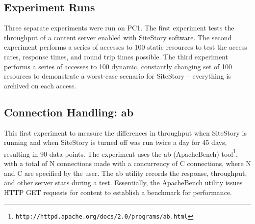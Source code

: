 \documentclass[runningheads,a4paper]{llncs}
\begin{document}


\subsection{Experiment Runs}
\label{runs}
\vskip -3mm
Three separate experiments were run on PC1. The first experiment tests the throughput of a content server enabled with SiteStory software. The second experiment performs a series of accesses to 100 static resources to test the access rates, response times, and round trip times possible. The third experiment performs a series of accesses to 100 dynamic, constantly changing set of 100 resources to demonstrate a worst-case scenario for SiteStory -- everything is archived on each access. 

\subsection{Connection Handling: ab}
\label{ab}
\vskip -3mm
This first experiment to measure the differences in throughput when SiteStory is running and when SiteStory is turned off was run twice a day 
for 45 days, resulting in 90 data points. 
The experiment uses the ab (ApacheBench) tool\footnote{\texttt{http://httpd.apache.org/docs/2.0/programs/ab.html}}, with a total of N
connections made with a concurrency of C connections, where N and C are
specified by the user.
 The ab utility records the response, throughput, and other server stats during a test. Essentially, the ApacheBench utility issues HTTP GET requests for content to establish a benchmark for performance. 
\end{document}
